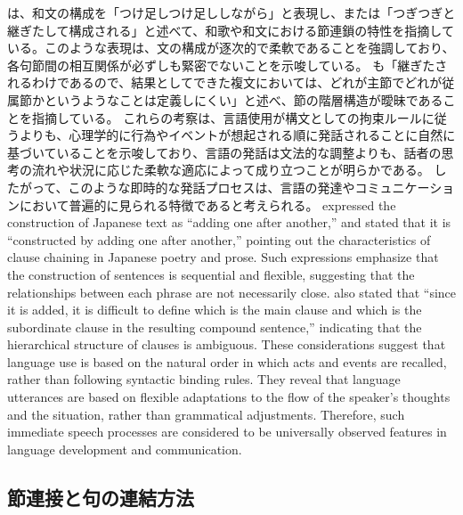 \documentclass[a4paper,xelatex,ja=standard]{bxjsarticle}
\begin{document}
\ifJPN
  \textcite{sakakura1975aj}は、和文の構成を「つけ足しつけ足ししながら」と表現し、また\textcite{komatu2003a}は「つぎつぎと継ぎたして構成される」と述べて、和歌や和文における節連鎖の特性を指摘している。このような表現は、文の構成が逐次的で柔軟であることを強調しており、各句節間の相互関係が必ずしも緊密でないことを示唆している。
  \textcite{kondo2005aj}も「継ぎたされるわけであるので、結果としてできた複文においては、どれが主節でどれが従属節かというようなことは定義しにくい」と述べ、節の階層構造が曖昧であることを指摘している。
  これらの考察は、言語使用が構文としての拘束ルールに従うよりも、心理学的に行為やイベントが想起される順に発話されることに自然に基づいていることを示唆しており、言語の発話は文法的な調整よりも、話者の思考の流れや状況に応じた柔軟な適応によって成り立つことが明らかである。
  したがって、このような即時的な発話プロセスは、言語の発達やコミュニケーションにおいて普遍的に見られる特徴であると考えられる。
\else
  \textcite{sakakura1975ae} expressed the construction of Japanese text as ``adding one after another,'' and \textcite{komatu2003ae} stated that it is ``constructed by adding one after another,'' pointing out the characteristics of clause chaining in Japanese poetry and prose. Such expressions emphasize that the construction of sentences is sequential and flexible, suggesting that the relationships between each phrase are not necessarily close. \textcite{kondo2005be} also stated that ``since it is added, it is difficult to define which is the main clause and which is the subordinate clause in the resulting compound sentence,'' indicating that the hierarchical structure of clauses is ambiguous. These considerations suggest that language use is based on the natural order in which acts and events are recalled, rather than following syntactic binding rules. They reveal that language utterances are based on flexible adaptations to the flow of the speaker's thoughts and the situation, rather than grammatical adjustments. Therefore, such immediate speech processes are considered to be universally observed features in language development and communication.
\fi


\ifJPN
  \subsection{節連接と句の連結方法}
\else
\end{document}
